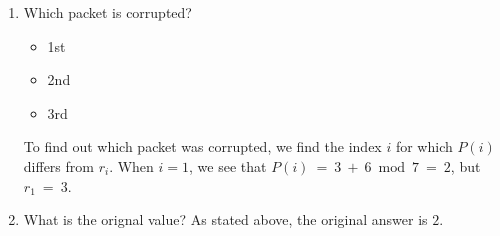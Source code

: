 \documentclass[11pt,preview]{standalone} %
\begin{document}
\begin{enumerate}
\begin{enumerate}
\begin{Freeform}{0}
    \end{Freeform}
    \item Which packet is corrupted?
      \begin{Choices}
        \begin{itemize}
        \TrueChoice \item 1st
        \FalseChoice \item 2nd
        \FalseChoice \item 3rd
        \end{itemize}
        \Solution To find out which packet was corrupted, we find the index $i$ for which $P(i)$ differs from $r_i$. When $i = 1$, we see that $P(i)\ =\ 3\ +\ 6 \bmod 7\ =\ 2$, but $r_1\ =\ 3$.
      \end{Choices}
    \item 
    \begin{Freeform}{2}
      What is the orignal value?
      \Solution As stated above, the original answer is $2$.
    \end{Freeform}
  \end{enumerate}
\end{enumerate}
\end{document}
